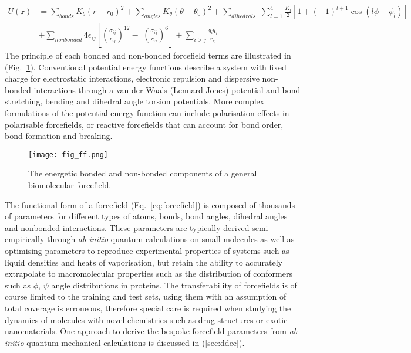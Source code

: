 %
\begin{equation} \label{eq:forcefield}
\begin{split}
U(\mathbf{r}) &= \sum_{bonds} K_b(r - r_0)^2 + \sum_{angles} K_{\theta}(\theta - \theta_0)^2 + \sum_{dihedrals} \, \, \sum_{l=1}^{4} \frac{K_{l}}{2}\left[1+(-1)^{l+1}\cos{(l\phi -\phi_{l})}\right] \\
&+ \sum_{nonbonded} 4\epsilon_{ij} \left[ \left( \frac{\sigma_{ij}}{r_{ij}}\right)^{12}-\,\,\left( \frac{\sigma_{ij}}{r_{ij}}\right)^{6} \right] + \sum_{i > j}  \frac{q_{i}q_{j}}{r_{ij}}
\end{split}
\end{equation}
%
The principle of each bonded and non-bonded forcefield terms are illustrated in (Fig.~\ref{fig_ff}). Conventional potential energy functions describe a system with fixed charge for electrostatic interactions, electronic repulsion and dispersive non-bonded interactions through a van der Waals (Lennard-Jones) potential and bond stretching, bending and dihedral angle torsion potentials. More complex formulations of the potential energy function can include polarisation effects in polarisable forcefields,\cite{ponder2010current} or reactive forcefields that can account for bond order, bond formation and breaking.\cite{van2001reaxff}
%
\begin{figure}[H]
    \centering
    \texttt{[image: fig\_ff.png]}
    \caption{The energetic bonded and non-bonded components of a general biomolecular forcefield.}
    \label{fig_ff}
\end{figure}
%
The functional form of a forcefield (Eq.~\ref{eq:forcefield}) is composed of thousands of parameters for different types of atoms, bonds, bond angles, dihedral angles and nonbonded interactions.\cite{harder2016opls3} These parameters are typically derived semi-empirically through \textit{ab initio} quantum calculations on small molecules as well as optimising parameters to reproduce experimental properties of systems such as liquid densities and heats of vaporisation,\cite{vanommeslaeghe2010charmm} but retain the ability to accurately extrapolate to macromolecular properties such as the distribution of conformers such as $\phi,\, \psi$ angle distributions in proteins.\cite{mackerell2004improved} The transferability of forcefields is of course limited to the training and test sets, using them with an assumption of total coverage is erroneous, therefore special care is required when studying the dynamics of molecules with novel chemistries such as drug structures or exotic nanomaterials.\cite{harder2016opls3} One approach to derive the bespoke forcefield parameters from \textit{ab initio} quantum mechanical calculations is discussed in (\ref{sec:ddec}).
%
